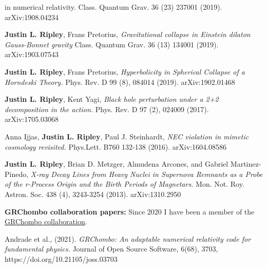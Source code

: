 \documentclass{my_cv}
\begin{document}
\begin{etaremune}
{      in numerical relativity}.
   Class. Quantum Grav. 36 (23) 237001 (2019).  
   arXiv:1908.04234
\item {\bf Justin L. Ripley}, Frans Pretorius, 
   \emph{Gravitational collapse in Einstein
      dilaton Gauss-Bonnet gravity}
   Class. Quantum Grav. 36 (13) 134001 (2019).
   arXiv:1903.07543
\item {\bf Justin L. Ripley}, Frans Pretorius, 
   \emph{Hyperbolicity in Spherical Collapse of a Horndeski Theory.}
   Phys. Rev. D 99 (8), 084014 (2019).
   arXiv:1902.01468
\item {\bf Justin L. Ripley}, Kent Yagi, 
   \emph{Black hole perturbation under a 2+2 decomposition
      in the action.}
   Phys. Rev. D 97 (2), 024009 (2017).
   arXiv:1705.03068
\item Anna Ijjas, {\bf Justin L. Ripley}, Paul J. Steinhardt,
   \emph{NEC violation in mimetic cosmology revisited.}
   Phys.Lett. B760 132-138 (2016).
   arXiv:1604.08586
\item {\bf Justin L. Ripley}, Brian D. Metzger,	
      Almudena Arcones, and Gabriel Martinez-Pinedo,
   \emph{X-ray Decay Lines from Heavy Nuclei in
      Supernova Remnants as a Probe of the r-Process Origin
      and the Birth Periods of Magnetars.}
   Mon. Not. Roy. Astron. Soc. 438 (4), 3243-3254 (2013).
   arXiv:1310.2950
\end{etaremune}

{\bf GRChombo collaboration papers:} Since 2020 I have been a member of the 
\href{https://www.grchombo.org/}{GRChombo collaboration}.
\begin{etaremune}
\item Andrade et al., (2021). 
   \emph{GRChombo: An adaptable numerical relativity code for fundamental physics.}
   Journal of Open Source Software, 6(68), 3703, 
   https://doi.org/10.21105/joss.03703
\end{etaremune}
\end{document}
